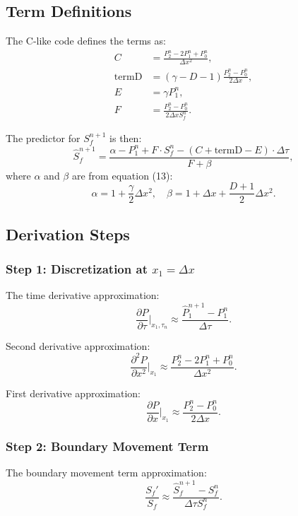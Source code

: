 \documentclass{article}
\begin{document}
\subsection{Term Definitions}
The C-like code defines the terms as:
\begin{align}
C &= \frac{P_2^n - 2P_1^n + P_0^n}{\Delta x^2}, \\
\text{termD} &= (\gamma - D - 1) \frac{P_2^n - P_0^n}{2\Delta x}, \\
E &= \gamma P_1^n, \\
F &= \frac{P_2^n - P_0^n}{2\Delta x S_f^n}.
\end{align}

The predictor for $S_f^{n+1}$ is then:
\begin{equation}
\hat{S}_f^{n+1} = \frac{\alpha - P_1^n + F \cdot S_f^n - (C + \text{termD} - E) \cdot \Delta \tau}{F + \beta},
\end{equation}
where $\alpha$ and $\beta$ are from equation (13):
\begin{equation}
\alpha = 1 + \frac{\gamma}{2} \Delta x^2, \quad \beta = 1 + \Delta x + \frac{D + 1}{2} \Delta x^2.
\end{equation}

\subsection{Derivation Steps}

\subsubsection{Step 1: Discretization at $x_1 = \Delta x$}
The time derivative approximation:
\begin{equation}
\frac{\partial P}{\partial \tau} \big|_{x_1, \tau_n} \approx \frac{\hat{P}_1^{n+1} - P_1^n}{\Delta \tau}.
\end{equation}

Second derivative approximation:
\begin{equation}
\frac{\partial^2 P}{\partial x^2} \big|_{x_1} \approx \frac{P_2^n - 2P_1^n + P_0^n}{\Delta x^2}.
\end{equation}

First derivative approximation:
\begin{equation}
\frac{\partial P}{\partial x} \big|_{x_1} \approx \frac{P_2^n - P_0^n}{2\Delta x}.
\end{equation}

\subsubsection{Step 2: Boundary Movement Term}
The boundary movement term approximation:
\begin{equation}
\frac{S_f'}{S_f} \approx \frac{\hat{S}_f^{n+1} - S_f^n}{\Delta \tau S_f^n}.
\end{equation}
\end{document}
